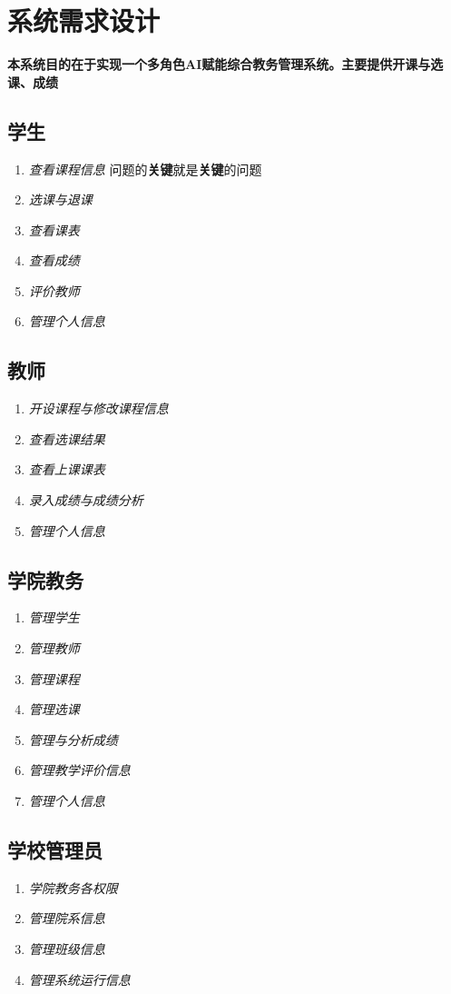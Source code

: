 \documentclass{article}
\begin{document}
    \section{系统需求设计}
    \textbf{本系统目的在于实现一个多角色AI赋能综合教务管理系统。主要提供开课与选课、成绩}
    \subsection{学生}
    \begin{enumerate}
        \item \textsl{查看课程信息} 问题的\textbf{关键}就是\textbf{关键}的问题
        \item \textsl{选课与退课}
        \item \textsl{查看课表}
        \item \textsl{查看成绩}
        \item \textsl{评价教师}
        \item \textsl{管理个人信息}
    \end{enumerate}
    \subsection{教师}
    \begin{enumerate}
        \item \textsl{开设课程与修改课程信息}
        \item \textsl{查看选课结果}
        \item \textsl{查看上课课表}
        \item \textsl{录入成绩与成绩分析}
        \item \textsl{管理个人信息}
    \end{enumerate}
    \subsection{学院教务}
    \begin{enumerate}
        \item \textsl{管理学生}
        \item \textsl{管理教师}
        \item \textsl{管理课程}
        \item \textsl{管理选课}
        \item \textsl{管理与分析成绩}
        \item \textsl{管理教学评价信息}
        \item \textsl{管理个人信息}
    \end{enumerate}
    \subsection{学校管理员}
    \begin{enumerate}
        \item \textsl{学院教务各权限} 
        \item \textsl{管理院系信息}
        \item \textsl{管理班级信息}
        \item \textsl{管理系统运行信息}
    \end{enumerate}
\end{document}
